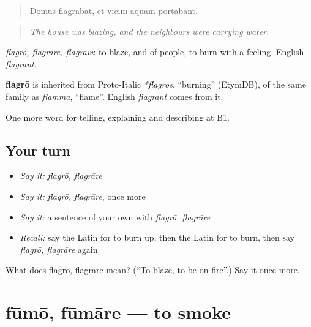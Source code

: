 \begin{quote}
Domus flagrābat, et vīcīnī aquam portābant.
\end{quote}

\begin{quote}
\emph{The house was blazing, and the neighbours were carrying water.}
\end{quote}

\emph{flagrō, flagrāre, flagrāvī}: to blaze, and of people, to burn with a feeling. English \emph{flagrant}.

\begin{cousinweb}
\textbf{flagrō} is inherited from Proto-Italic \emph{*flagros}, \textquotedblleft{}burning\textquotedblright{} (EtymDB), of the same family as \emph{flamma}, \textquotedblleft{}flame\textquotedblright{}. English \emph{flagrant} comes from it.
\end{cousinweb}

\begin{grammarlens}[title={What you've built}]
One more word for telling, explaining and describing at B1.
\end{grammarlens}

\subsection*{Your turn}
\begin{itemize}
\raggedright
  \item \emph{Say it:} \emph{flagrō, flagrāre}
  \item \emph{Say it:} \emph{flagrō, flagrāre}, once more
  \item \emph{Say it:} a sentence of your own with \emph{flagrō, flagrāre}
  \item \emph{Recall:} say the Latin for to burn up, then the Latin for to burn, then say \emph{flagrō, flagrāre} again
\end{itemize}

\begin{tcolorbox}[breakable,colback=teal!4,colframe=teal!35!black,title={Before you move on}]
What does flagrō, flagrāre mean? (\textquotedblleft{}To blaze, to be on fire\textquotedblright{}.) Say it once more.
\end{tcolorbox}
\section[fūmō, fūmāre]{fūmō, fūmāre — to smoke}

\label{lesson:LA-C318-fumo}



